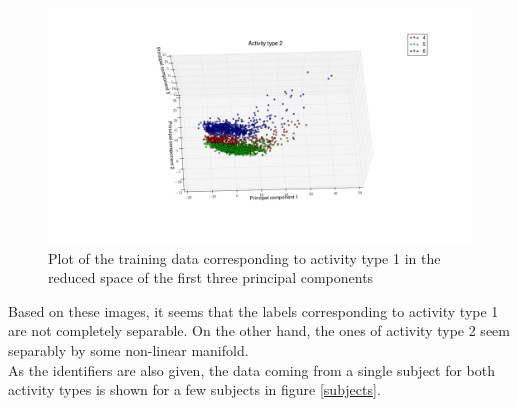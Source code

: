 \documentclass [a4paper] {report}
\begin{document}
	\begin{figure}[H]
		\begin{center}
			\includegraphics[scale=0.35]{Images/Xtrn2.png}
			\caption{Plot of the training data corresponding to activity type 1 in the reduced space of the first three principal components}
			\label{Xtrn2}
		\end{center}
	\end{figure}
	
	\noindent
	Based on these images, it seems that the labels corresponding to activity type 1 are not completely separable. On the other hand, the ones of activity type 2 seem separably by some non-linear manifold.\\
	
	\noindent
	As the identifiers are also given, the data coming from a single subject for both activity types is shown for a few subjects in figure \ref{subjects}.
	
\end{document}
